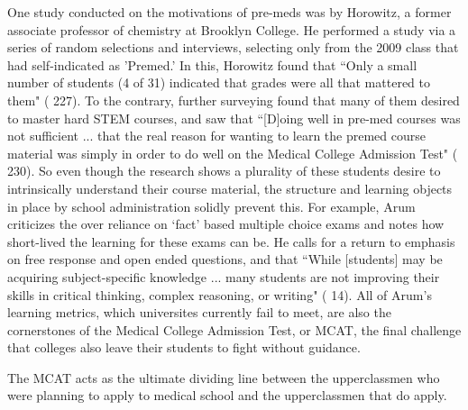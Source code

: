 \documentclass [12pt]{article}
\begin{document}
\begin{flushleft}
One study conducted on the motivations of pre-meds was by Horowitz, a former associate professor of chemistry at Brooklyn College. He performed a study via a series of random selections and interviews, selecting only from the 2009 class that had self-indicated as 'Premed.' In this, Horowitz found that  {``}Only a small number of students (4 of 31) indicated that grades were all that mattered to them" (\cite{Horowitz-2010} 227). To the contrary, further surveying found that many of them desired to master hard STEM courses, and saw that {``}[D]oing well in pre-med courses was not sufficient ... that the real reason for wanting to learn the premed course material was simply in order to do well on the Medical College Admission Test" (\cite{Horowitz-2010} 230). So even though the research shows a plurality of these students desire to intrinsically understand their course material, the structure and learning objects in place by school administration solidly prevent this. For example, Arum criticizes the over reliance on {`}fact' based multiple choice exams and notes how short-lived the learning for these exams can be. He calls for a return to emphasis on free response and open ended questions, and that {``}While [students] may be acquiring subject-specific knowledge ...  many students are not improving their skills in critical thinking, complex reasoning, or writing" (\cite{Arum-2011} 14). All of Arum's learning metrics, which universites currently fail to meet, are also the cornerstones of the Medical College Admission Test, or MCAT, the final challenge that colleges also leave their students to fight without guidance.

The MCAT acts as the ultimate dividing line between the upperclassmen who were planning to apply to medical school  and the upperclassmen that do apply.
	  
	
	
	
\newpage
\medskip %
\nocite{*} %
\printbibliography%
\end{flushleft}
\end{document}

